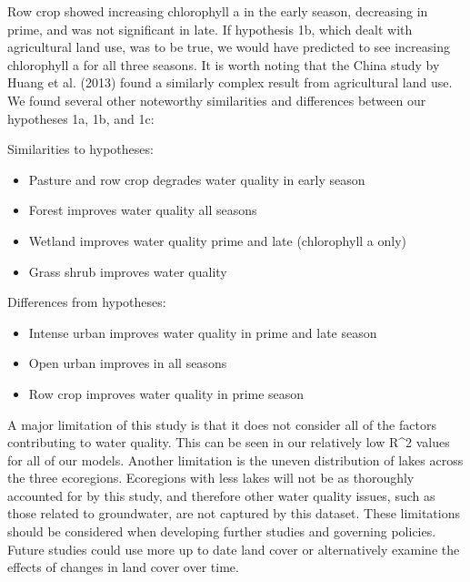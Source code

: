 \documentclass[12pt,]{article}
\providecommand{\tightlist}{%
  \setlength{\itemsep}{0pt}\setlength{\parskip}{0pt}}
\begin{document}
Row crop showed increasing chlorophyll a in the early season, decreasing
in prime, and was not significant in late. If hypothesis 1b, which dealt
with agricultural land use, was to be true, we would have predicted to
see increasing chlorophyll a for all three seasons. It is worth noting
that the China study by Huang et al. (2013) found a similarly complex
result from agricultural land use. We found several other noteworthy
similarities and differences between our hypotheses 1a, 1b, and 1c:

Similarities to hypotheses:

\begin{itemize}
\tightlist
\item
  Pasture and row crop degrades water quality in early season
\item
  Forest improves water quality all seasons
\item
  Wetland improves water quality prime and late (chlorophyll a only)
\item
  Grass shrub improves water quality
\end{itemize}

Differences from hypotheses:

\begin{itemize}
\tightlist
\item
  Intense urban improves water quality in prime and late season
\item
  Open urban improves in all seasons
\item
  Row crop improves water quality in prime season
\end{itemize}

A major limitation of this study is that it does not consider all of the
factors contributing to water quality. This can be seen in our
relatively low R\^{}2 values for all of our models. Another limitation
is the uneven distribution of lakes across the three ecoregions.
Ecoregions with less lakes will not be as thoroughly accounted for by
this study, and therefore other water quality issues, such as those
related to groundwater, are not captured by this dataset. These
limitations should be considered when developing further studies and
governing policies. Future studies could use more up to date land cover
or alternatively examine the effects of changes in land cover over time.
\end{document}
